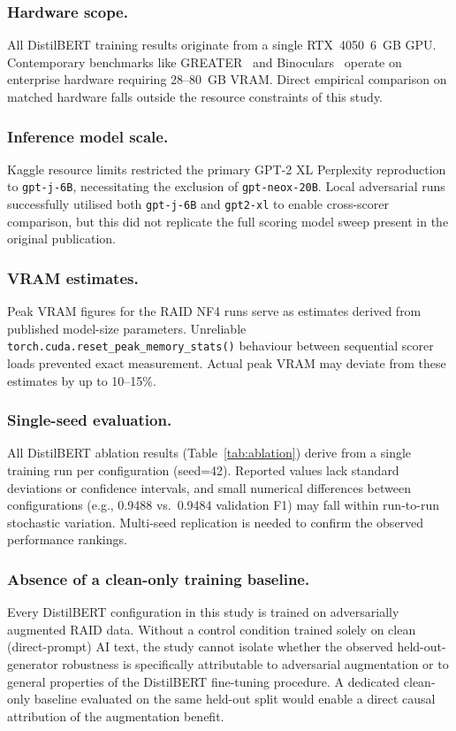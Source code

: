 \documentclass[conference]{IEEEtran}
\begin{document}
\subsubsection{Hardware scope.} All DistilBERT training results originate from a
single RTX~4050~6~GB GPU. Contemporary benchmarks like GREATER~\cite{li2025} and
Binoculars~\cite{hans2024} operate on enterprise hardware requiring 28--80~GB VRAM.
Direct empirical comparison on matched hardware falls outside the resource constraints
of this study.

\subsubsection{Inference model scale.} Kaggle resource limits restricted the primary
GPT-2 XL Perplexity reproduction to \texttt{gpt-j-6B}, necessitating the exclusion of
\texttt{gpt-neox-20B}. Local adversarial runs successfully utilised both
\texttt{gpt-j-6B} and \texttt{gpt2-xl} to enable cross-scorer comparison, but this
did not replicate the full scoring model sweep present in the original publication.

\subsubsection{VRAM estimates.} Peak VRAM figures for the RAID NF4 runs serve as
estimates derived from published model-size parameters. Unreliable
\texttt{torch.cuda.reset\_peak\_memory\_stats()} behaviour between sequential
scorer loads prevented exact measurement. Actual peak VRAM may deviate from
these estimates by up to 10--15\%.

\subsubsection{Single-seed evaluation.} All DistilBERT ablation results
(Table~\ref{tab:ablation}) derive from a single training run per configuration
(seed=42). Reported values lack standard deviations or confidence intervals,
and small numerical differences between configurations (e.g., 0.9488 vs.\
0.9484 validation F1) may fall within run-to-run stochastic variation.
Multi-seed replication is needed to confirm the observed performance rankings.

\subsubsection{Absence of a clean-only training baseline.}
Every DistilBERT
configuration in this study is trained on adversarially augmented RAID data.
Without a control condition trained solely on clean (direct-prompt) AI text,
the study cannot isolate whether the observed held-out-generator robustness
is specifically attributable to adversarial augmentation or to general
properties of the DistilBERT fine-tuning procedure. A dedicated clean-only
baseline evaluated on the same held-out split would enable a direct causal
attribution of the augmentation benefit.
\end{document}
